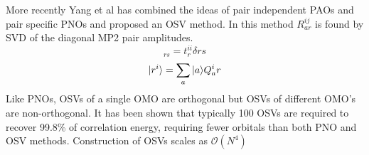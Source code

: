 		More recently Yang et al\cite{Yang2011} has combined the ideas of pair independent PAOs and pair specific PNOs and proposed an OSV method. In this method $R^{ij}_{ar}$ is found by SVD of the diagonal MP2 pair amplitudes. 
			\begin{equation}
				[R^{i\dagger} T^{ij} R^{i}]_{rs} = t^{ii}_r \delta{rs}
			\end{equation}
			\begin{equation}
				| r^i \rangle = \sum_a | a \rangle Q^i_ar
			\end{equation}
		Like PNOs, OSVs of a single OMO are orthogonal but OSVs of different OMO's are non-orthogonal. It has been shown that typically 100 OSVs are required to recover 99.8\% of correlation energy, requiring fewer orbitals than both PNO and OSV methods. Construction of OSVs scales as  $\mathcal{O}(N^4)$